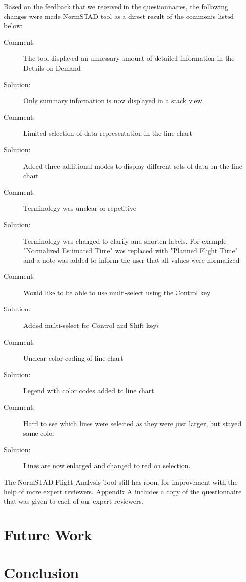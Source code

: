 \documentclass{sig-alternate}
\begin{document}
Based on the feedback that we received in the questionnaires, the following changes
were made NormSTAD tool as a direct result of the comments listed below:
\begin{description}
	\item[Comment: ] The tool displayed an unnessary amount of detailed information
in the Details on Demand
	\item[Solution: ] Only summary information is now displayed in a stack view.
	\item[Comment: ] Limited selection of data representation in the line chart
	\item[Solution: ] Added three additional modes to display different sets of data
on the line chart
	\item[Comment: ] Terminology was unclear or repetitive
	\item[Solution: ] Terminology was changed to clarify and shorten labels. For example
"Normalized Estimated Time" was replaced with "Planned Flight Time" and a note was
added to inform the user that all values were normalized
	\item[Comment: ] Would like to be able to use multi-select using the Control key
	\item[Solution: ] Added multi-select for Control and Shift keys
	\item[Comment: ] Unclear color-coding of line chart
	\item[Solution: ] Legend with color codes added to line chart
	\item[Comment: ] Hard to see which lines were selected as they were just larger, but
stayed same color
	\item[Solution: ] Lines are now enlarged and changed to red on selection.
\end{description}

The NormSTAD Flight Analysis Tool still has room for improvement with the help
of more expert reviewers. Appendix A includes a copy of the questionnaire that 
was given to each of our expert reviewers. 
  
	
\section{Future Work}
\label{sec-future-work}

\section{Conclusion}
\label{sec-conclusion}
\end{document}
